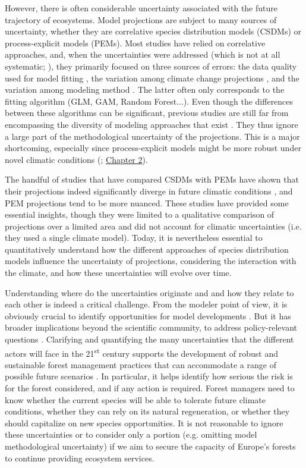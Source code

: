 However, there is often considerable uncertainty associated with the future trajectory of ecosystems. Model projections are subject to many sources of uncertainty, whether they are correlative species distribution models (CSDMs) or process-explicit models (PEMs). Most studies have relied on correlative approaches, and, when the uncertainties were addressed (which is not at all systematic; \citealp{Simmonds2024}), they primarily focused on three sources of errors: the data quality used for model fitting \citep{Chen2013, BarbetMassin2010, Duputie2014, Faurby2018}, the variation among climate change projections \citep{Beaumont2007, DinizFilho2009, Thuiller2019}, and the variation among modeling method \citep{Pearson2006, DinizFilho2009, Thuiller2019}. The latter often only corresponds to the fitting algorithm (GLM, GAM, Random Forest...). Even though the differences between these algorithms can be significant, previous studies are still far from encompassing the diversity of modeling approaches that exist \citep{Dormann2012}. They thus ignore a large part of the methodological uncertainty of the projections. This is a major shortcoming, especially since process-explicit models might be more robust under novel climatic conditions (\citealp{VanderMeersch2024}; \hyperref[chapter2]{Chapter 2}).

The handful of studies that have compared CSDMs with PEMs have shown that their projections indeed significantly diverge in future climatic conditions \citep{Morin2009, Keenan2011a, Cheaib2012, Takolander2019}, and PEM projections tend to be more nuanced. These studies have provided some essential insights, though they were limited to a qualitative comparison of projections over a limited area and did not account for climatic uncertainties (i.e. they used a single climate model). Today, it is nevertheless essential to quantitatively understand how the different approaches of species distribution models influence the uncertainty of projections, considering the interaction with the climate, and how these uncertainties will evolve over time.

Understanding where do the uncertainties originate and  and how they relate to each other is indeed a critical challenge. From the modeler point of view, it is obviously crucial to identify opportunities for model developments \citep{Petchey2015}. But it has broader implications beyond the scientific community, to address policy-relevant questions \citep{Urban2016}. Clarifying and quantifying the many uncertainties that the different actors will face in the 21\textsuperscript{st} century supports the development of robust and sustainable forest management practices that can accommodate a range of possible future scenarios \citep{IPCC2021}. In particular, it helps identify how serious the risk is for the forest considered, and if any action is required. Forest managers need to know whether the current species will be able to tolerate future climate conditions, whether they can rely on its natural regeneration, or whether they should capitalize on new species opportunities. It is not reasonable to ignore these uncertainties or to consider only a portion (e.g. omitting model methodological uncertainty) if we aim to secure the capacity of Europe’s forests to continue providing ecosystem services. 

